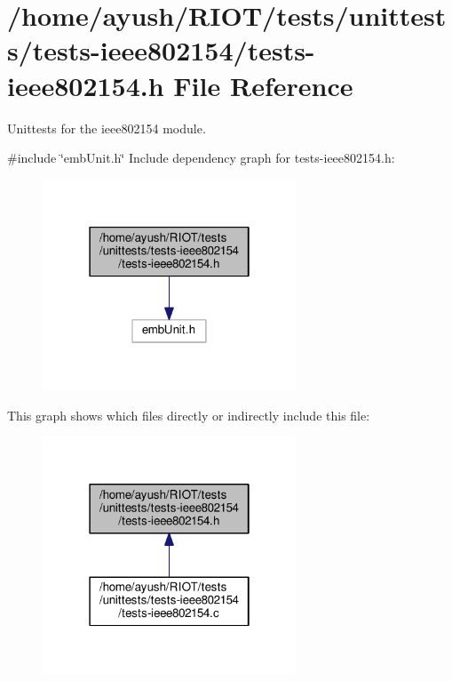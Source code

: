 \hypertarget{tests-ieee802154_8h}{}\section{/home/ayush/\+R\+I\+O\+T/tests/unittests/tests-\/ieee802154/tests-\/ieee802154.h File Reference}
\label{tests-ieee802154_8h}


Unittests for the {\ttfamily ieee802154} module.  


{\ttfamily \#include \char`\"{}emb\+Unit.\+h\char`\"{}}\newline
Include dependency graph for tests-\/ieee802154.h\+:
\nopagebreak
\begin{figure}[H]
\begin{center}
\leavevmode
\includegraphics[width=214pt]{tests-ieee802154_8h__incl}
\end{center}
\end{figure}
This graph shows which files directly or indirectly include this file\+:
\nopagebreak
\begin{figure}[H]
\begin{center}
\leavevmode
\includegraphics[width=214pt]{tests-ieee802154_8h__dep__incl}
\end{center}
\end{figure}
